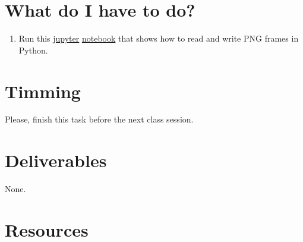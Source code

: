 \section{What do I have to do?}

\begin{enumerate}
\item Run this \href{https://jupyter.org/}{jupyter}
  \href{https://github.com/Sistemas-Multimedia/Sistemas-Multimedia.github.io/blob/master/contents/PNG/display_video.ipynb}{notebook}
  that shows how to read and write PNG frames in Python.
\end{enumerate}

\section{Timming}

Please, finish this task before the next class session.

\section{Deliverables}

None.

\section{Resources}

\renewcommand{\addcontentsline}[3]{}%

